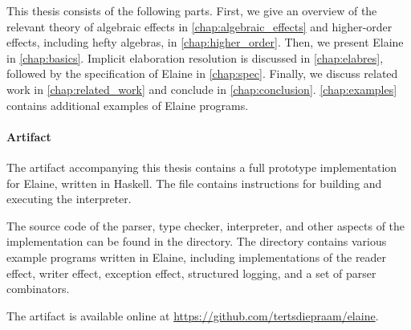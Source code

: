 %
This thesis consists of the following parts. First, we give an overview of the relevant theory of algebraic effects in \cref{chap:algebraic_effects} and higher-order effects, including hefty algebras, in \cref{chap:higher_order}. Then, we present Elaine in \cref{chap:basics}. Implicit elaboration resolution is discussed in \cref{chap:elabres}, followed by the specification of Elaine in \cref{chap:spec}. Finally, we discuss related work in \cref{chap:related_work} and conclude in \cref{chap:conclusion}. \cref{chap:examples} contains additional examples of Elaine programs.

\paragraph{Artifact}
The artifact accompanying this thesis contains a full prototype implementation for Elaine, written in Haskell. The  file contains instructions for building and executing the interpreter.

The source code of the parser, type checker, interpreter, and other aspects of the implementation can be found in the  directory. The  directory contains various example programs written in Elaine, including implementations of the reader effect, writer effect, exception effect, structured logging, and a set of parser combinators.

The artifact is available online at \url{https://github.com/tertsdiepraam/elaine}.
